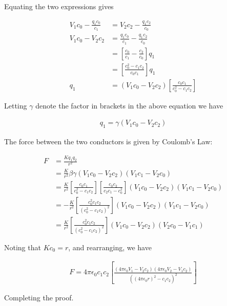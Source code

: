\documentclass[paper=a4, fontsize=11pt]{scrartcl} %
\numberwithin{equation}{section} %
\numberwithin{figure}{section} %
\numberwithin{table}{section} %
\begin{document}
Equating the two expressions gives

\begin{align}
V_1 c_0 - \frac{q_1 c_0}{c_1} &=  V_2 c_2 - \frac{q_1 c_2}{c_0} \\
V_1 c_0 - V_2 c_2 &= \frac{q_1 c_0}{c_1} - \frac{q_1 c_2}{c_0} \\
&= \left[ \frac{c_0}{c_1} - \frac{c_2}{c_0} \right] q_1 \\
&= \left[ \frac{c_0^2 - c_1 c_2}{c_0 c_1} \right] q_1 \\
q_1 &= \left( V_1 c_0 - V_2 c_2 \right) \left[ \frac{c_0 c_1}{c_0^2 - c_1 c_2} \right]
\end{align}

Letting $\gamma$ denote the factor in brackets in the above equation we have

\begin{align}
q_1 = \gamma \left(V_1 c_0 - V_2 c_2\right)
\end{align}

The force between the two conductors is given by Coulomb's Law:

\begin{align}
F &= \frac{K q_1 q_2}{r^2} \\
&= \frac{K}{r^2} \beta \gamma \left(V_1 c_0 - V_2 c_2 \right) \left(V_1 c_1 - V_2 c_0 \right) \\
&=\frac{K}{r^2} \left[\frac{c_0 c_1}{c_0^2 - c_1 c_2} \right]\left[\frac{c_0 c_2}{c_2 c_1 - c_0^2} \right] \left(V_1 c_0 - V_2 c_2 \right) \left(V_1 c_1 - V_2 c_0 \right) \\
&= -\frac{K}{r^2} \left[\frac{c_0^2 c_1 c_2}{\left(c_0^2 - c_1 c_2\right)^2}\right]\left(V_1c_0 - V_2 c_2\right)\left(V_1 c_1 - V_2 c_0\right)\\
&= \frac{K}{r^2} \left[\frac{c_0^2 c_1 c_2}{\left(c_0^2 - c_1 c_2\right)^2}\right]\left(V_1 c_0 - V_2 c_2\right)\left(V_2c_0 - V_1 c_1\right)
\end{align}

Noting that $K c_0 = r$, and rearranging, we have

\begin{align}
F = 4 \pi \epsilon_0 c_1 c_2\left[\frac{\left(4 \pi \epsilon_0 V_1 - V_2 c_2\right)\left(4 \pi \epsilon_0 V_2 - V_1 c_2\right)}{\left(\left(4 \pi \epsilon_0 r\right)^2 - c_1 c_2\right)^2}\right]
\end{align}

Completing the proof.

\end{document}
